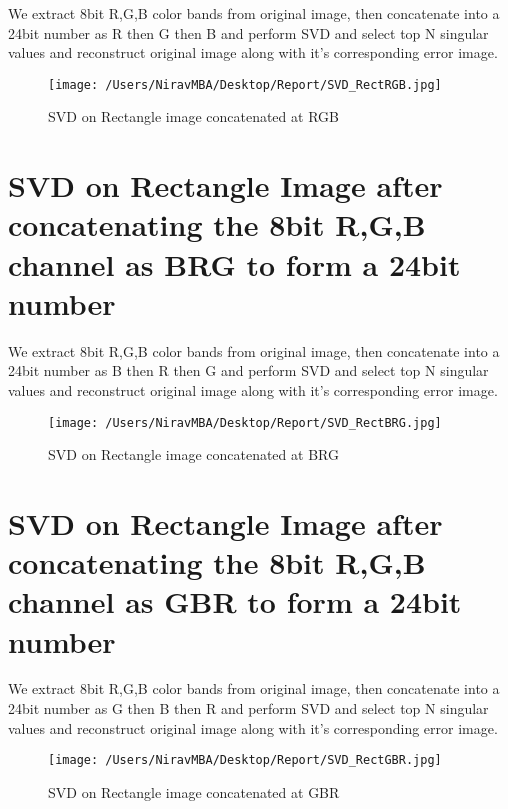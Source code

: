 \documentclass[12pt]{report}
\begin{document}
We extract 8bit R,G,B color bands from original image, then concatenate into a 24bit number as R then G then B and perform SVD and select top N singular values and reconstruct original image along with it's corresponding error image.\\

\begin{figure}[H]
	
	\texttt{[image: /Users/NiravMBA/Desktop/Report/SVD\_RectRGB.jpg]}
	\caption{SVD on Rectangle image concatenated at RGB}
\end{figure}
\cleardoublepage

\section{SVD on Rectangle Image after concatenating the 8bit R,G,B channel as BRG to form a 24bit number }

We extract 8bit R,G,B color bands from original image, then concatenate into a 24bit number as B then R then G and perform SVD and select top N singular values and reconstruct original image along with it's corresponding error image.\\

\begin{figure}[H]
	
	\texttt{[image: /Users/NiravMBA/Desktop/Report/SVD\_RectBRG.jpg]}
	\caption{SVD on Rectangle image concatenated at BRG}
\end{figure}
\cleardoublepage

\section{SVD on Rectangle Image after concatenating the 8bit R,G,B channel as GBR to form a 24bit number }

We extract 8bit R,G,B color bands from original image, then concatenate into a 24bit number as G then B then R and perform SVD and select top N singular values and reconstruct original image along with it's corresponding error image.\\

\begin{figure}[H]
	
	\texttt{[image: /Users/NiravMBA/Desktop/Report/SVD\_RectGBR.jpg]}
	\caption{SVD on Rectangle image concatenated at GBR}
\end{figure}
\cleardoublepage
\end{document}
